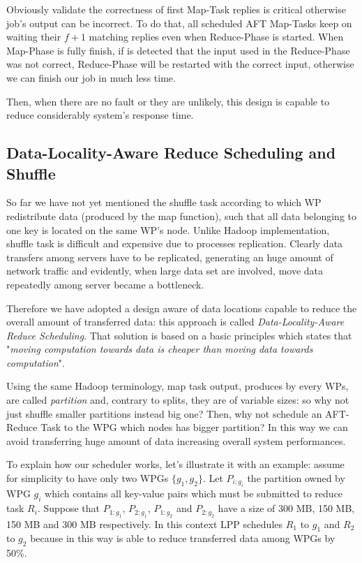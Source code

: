 \documentclass[sigchi]{acmart}
\begin{document}
Obviously validate the correctness of first Map-Task replies is critical otherwise job's output can be incorrect. To do that, all scheduled AFT Map-Tasks keep on waiting their $f + 1$ matching replies even when Reduce-Phase is started. When Map-Phase is fully finish, if is detected that the input used in the Reduce-Phase was not correct, Reduce-Phase will be restarted with the correct input, otherwise we can finish our job in much less time.

Then, when there are no fault or they are unlikely, this design is capable to reduce considerably system's response time. 

\subsection{Data-Locality-Aware Reduce Scheduling and Shuffle}

So far we have not yet mentioned the shuffle task according to which WP redistribute data (produced by the map function), such that all data belonging to one key is located on the same WP's node. Unlike Hadoop implementation, shuffle task is difficult and expensive due to processes replication. Clearly data transfers among servers have to be replicated, generating an huge amount of network traffic and evidently, when large data set are involved, move data repeatedly among server became a bottleneck. 

Therefore we have adopted a design aware of data locations capable to reduce the overall amount of transferred data: this approach is called \textit{Data-Locality-Aware Reduce Scheduling}. That solution is based on a basic principles which states that "\textit{moving computation towards data is cheaper than moving data towards computation}".

Using the same Hadoop terminology, map task output, produces by every WPs, are called \textit{partition} and, contrary to splits, they are of variable sizes: so why not just shuffle smaller partitions instead big one? Then, why not schedule an AFT-Reduce Task to the WPG which nodes has bigger partition? In this way we can avoid transferring huge amount of data increasing overall system performances.

To explain how our scheduler works, let's illustrate it with an example: assume for simplicity to have only two WPGs $\lbrace g_1, g_2 \rbrace$. Let $P_{i:g_i}$ the partition owned by WPG $g_i$ which contains all key-value pairs which must be submitted to reduce task $R_i$. Suppose that $P_{1:g_1}$, $P_{2:g_1}$, $P_{1:g_2}$ and $P_{2:g_2}$ have a size of 300 MB, 150 MB, 150 MB and 300 MB respectively. In this context LPP schedules $R_1$ to $g_1$ and $R_2$ to $g_2$ because in this way is able to reduce transferred data among WPGs by 50\%. 
\end{document}

